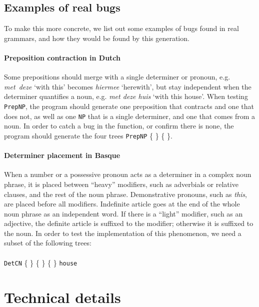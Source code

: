 \documentclass[11pt]{article}
\def\t#1{\texttt{#1}}
\newcommand{\tts}[1]{{\tt #1}}
\begin{document}
\subsection{Examples of real bugs} 
To make this more concrete, we list out some examples of bugs found in real grammars, and how they would be found by this generation.

\paragraph{Preposition contraction in Dutch} Some prepositions should merge with a single determiner or pronoun, e.g. \emph{met~deze} `with this' becomes \emph{hiermee} `herewith', but stay independent when the determiner quantifies a noun, e.g. \emph{met deze huis} `with this house'. When testing \t{PrepNP}, the program should generate one preposition that contracts and one that does not, as well as one \t{NP} that is a single determiner, and one that comes from a noun. 
In order to catch a bug in the function, or confirm there is none, the program should generate the four trees
\t{PrepNP} \{  \} \{  \}. 

\paragraph{Determiner placement in Basque} When a number or a possessive pronoun acts as a determiner in a complex noun phrase, it is placed
between ``heavy'' modifiers, such as adverbials or relative clauses, and the rest of the noun phrase. Demonstrative pronouns, such as \emph{this},
 are placed before all modifiers. Indefinite article goes at the end of the whole noun phrase as an independent word.
If there is a ``light'' modifier, such as an adjective, the definite article is suffixed to the modifier; otherwise it is suffixed to the noun.
In order to test the implementation of this phenomenon, we need a subset of the following trees: \\ \\
\t{DetCN} \{ \stackanchor{\stackanchor{\tts{a}}{\tts{the}}}{\stackanchor{\tts{this}}{\tts{your}}} \} \{  \} \{  \}  {\tt house}





\section{Technical details}
\label{sec:details}
\end{document}
